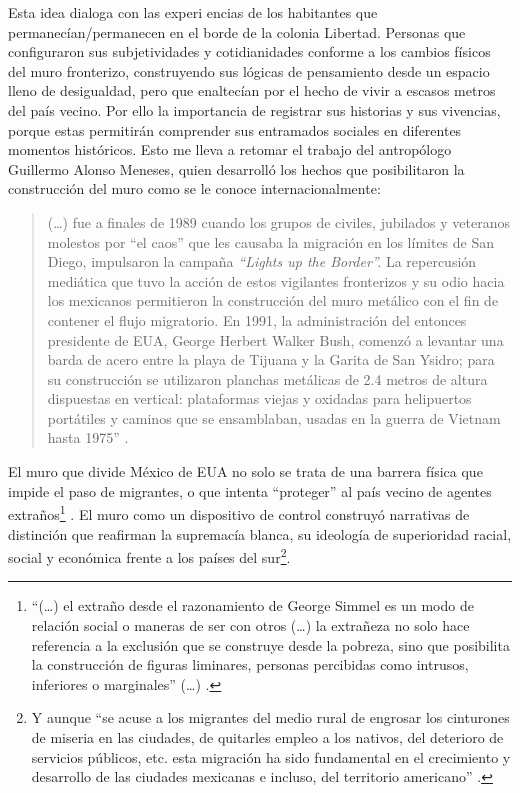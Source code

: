 \documentclass[
  spanish,
  11pt,
  a4paper,
]{scrbook}
\begin{document}
Esta idea dialoga con las experi encias de los habitantes que
permanecían/permanecen en el borde de la colonia Libertad. Personas que
configuraron sus subjetividades y cotidianidades conforme a los cambios
físicos del muro fronterizo, construyendo sus lógicas de pensamiento
desde un espacio lleno de desigualdad, pero que enaltecían por el hecho
de vivir a escasos metros del país vecino. Por ello la importancia de
registrar sus historias y sus vivencias, porque estas permitirán
comprender sus entramados sociales en diferentes momentos históricos.
Esto me lleva a retomar el trabajo del antropólogo Guillermo Alonso
Meneses, quien desarrolló los hechos que posibilitaron la construcción
del muro como se le conoce internacionalmente:

\begin{quote}
(\ldots) fue a finales de 1989 cuando los grupos de civiles, jubilados y
veteranos molestos por ``el caos'' que les causaba la migración en los
límites de San Diego, impulsaron la campaña \emph{``Lights up the
Border''.} La repercusión mediática que tuvo la acción de estos
vigilantes fronterizos y su odio hacia los mexicanos permitieron la
construcción del muro metálico con el fin de contener el flujo
migratorio. En 1991, la administración del entonces presidente de EUA,
George Herbert Walker Bush, comenzó a levantar una barda de acero entre
la playa de Tijuana y la Garita de San Ysidro; para su construcción se
utilizaron planchas metálicas de 2.4 metros de altura dispuestas en
vertical: plataformas viejas y oxidadas para helipuertos portátiles y
caminos que se ensamblaban, usadas en la guerra de Vietnam hasta 1975''
\autocite[265]{Meneses2023}.
\end{quote}

El muro que divide México de EUA no solo se trata de una barrera física
que impide el paso de migrantes, o que intenta ``proteger'' al país
vecino de agentes extraños\footnote{``(\ldots) el extraño desde el
  razonamiento de George Simmel es un modo de relación social o maneras
  de ser con otros (\ldots) la extrañeza no solo hace referencia a la
  exclusión que se construye desde la pobreza, sino que posibilita la
  construcción de figuras liminares, personas percibidas como intrusos,
  inferiores o marginales'' (\ldots) \autocite[PÁG]{Simmel2014a}.}
\autocite{Simmel2014a}. El muro como un dispositivo de control
\autocite{Foucault1976} construyó narrativas de distinción que reafirman
la supremacía blanca, su ideología de superioridad racial, social y
económica frente a los países del sur\footnote{Y aunque ``se acuse a los
  migrantes del medio rural de engrosar los cinturones de miseria en las
  ciudades, de quitarles empleo a los nativos, del deterioro de
  servicios públicos, etc. esta migración ha sido fundamental en el
  crecimiento y desarrollo de las ciudades mexicanas e incluso, del
  territorio americano'' \autocite{JesusArroyo2018}.}.
\end{document}
